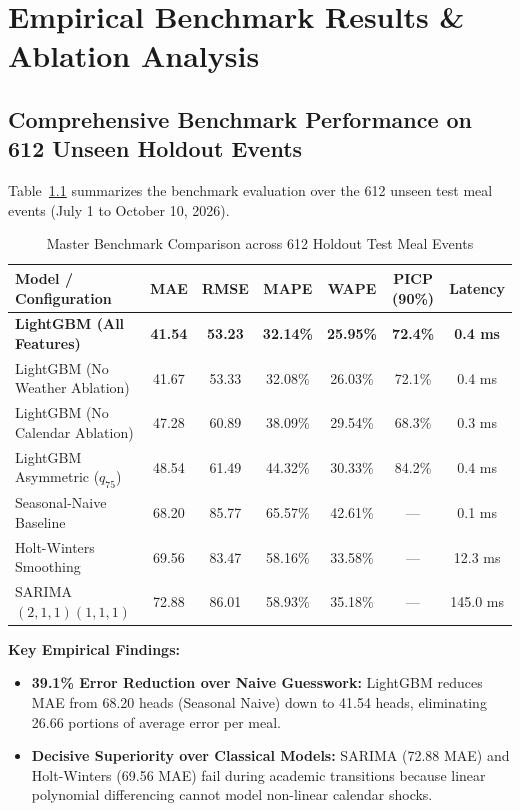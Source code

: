 \documentclass[11pt,a4paper,oneside]{report}
\begin{document}
\chapter{Empirical Benchmark Results \& Ablation Analysis}

\section{Comprehensive Benchmark Performance on 612 Unseen Holdout Events}
Table~\ref{tab:benchmarks} summarizes the benchmark evaluation over the 612 unseen test meal events (July 1 to October 10, 2026).

\begin{table}[ht]
\centering
\small
\renewcommand{\arraystretch}{1.3}
\begin{tabularx}{\textwidth}{lcccccc}
\toprule
\rowcolor{bluelight}
\textbf{Model / Configuration} & \textbf{MAE} & \textbf{RMSE} & \textbf{MAPE} & \textbf{WAPE} & \textbf{PICP (90\%)} & \textbf{Latency} \\
\midrule
\textbf{LightGBM (All Features)} & \textbf{41.54} & \textbf{53.23} & \textbf{32.14\%} & \textbf{25.95\%} & \textbf{72.4\%} & \textbf{0.4 ms} \\
LightGBM (No Weather Ablation) & 41.67 & 53.33 & 32.08\% & 26.03\% & 72.1\% & 0.4 ms \\
LightGBM (No Calendar Ablation) & 47.28 & 60.89 & 38.09\% & 29.54\% & 68.3\% & 0.3 ms \\
LightGBM Asymmetric ($q_{75}$) & 48.54 & 61.49 & 44.32\% & 30.33\% & 84.2\% & 0.4 ms \\
Seasonal-Naive Baseline & 68.20 & 85.77 & 65.57\% & 42.61\% & --- & 0.1 ms \\
Holt-Winters Smoothing & 69.56 & 83.47 & 58.16\% & 33.58\% & --- & 12.3 ms \\
SARIMA$(2,1,1)(1,1,1)$ & 72.88 & 86.01 & 58.93\% & 35.18\% & --- & 145.0 ms \\
\bottomrule
\end{tabularx}
\caption{Master Benchmark Comparison across 612 Holdout Test Meal Events}
\label{tab:benchmarks}
\end{table}

\textbf{Key Empirical Findings:}
\begin{itemize}
  \item \textbf{39.1\% Error Reduction over Naive Guesswork:} LightGBM reduces MAE from 68.20 heads (Seasonal Naive) down to 41.54 heads, eliminating 26.66 portions of average error per meal.
  \item \textbf{Decisive Superiority over Classical Models:} SARIMA (72.88 MAE) and Holt-Winters (69.56 MAE) fail during academic transitions because linear polynomial differencing cannot model non-linear calendar shocks.
\end{itemize}
\end{document}
